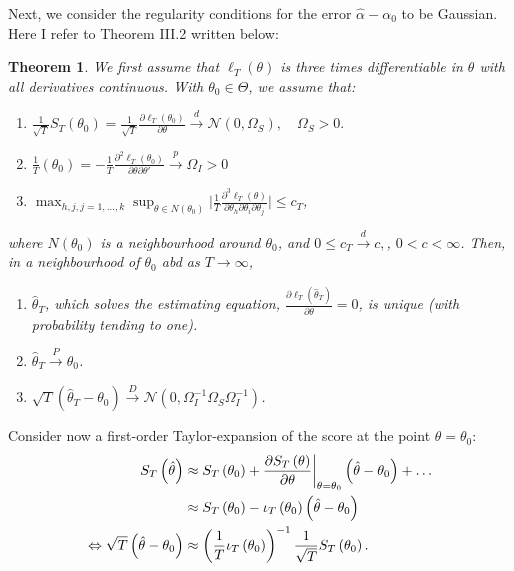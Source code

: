 \documentclass[11pt,a4paper,oneside]{article}
\newcommand{\LL}{\Leftrightarrow}
\newcommand{\lp}{\left(}
\newcommand{\rp}{\right)}
\newcommand{\nnn}{\mathcal{N}}
\newtheorem{theorem}{Theorem}
\begin{document}
Next, we consider the regularity conditions for the error $\hat \alpha - \alpha_0$ to be Gaussian. Here I refer to Theorem III.2 written below:
\begin{theorem}
We first assume that $\ell_T\lp \theta\rp$ is three times differentiable in $\theta$ with all derivatives continuous. With $\theta_0 \in \Theta$, we assume that:
\begin{enumerate}
    \item $\frac{1}{\sqrt{T}}S_T\lp \theta_0\rp = \frac{1}{\sqrt{T}}\frac{\partial \ell_T\lp \theta_0\rp}{\partial\theta} \overset{d}{\rightarrow} \nnn\lp 0, \Omega_S\rp, \quad \Omega_S > 0.$
    \item $\frac{1}{T}\lp \theta_0\rp = - \frac{1}{T}\frac{\partial^2 \ell_T\lp \theta_0\rp}{\partial\theta\partial\theta'}\overset{p}{\rightarrow}\Omega_I>0$
    \item $\max_{h,j,j=1, \dots, k}\sup_{\theta\in N\lp\theta_0\rp}\bigg\vert \frac{1}{T}\frac{\partial^3 \ell_T\lp \theta\rp}{\partial \theta_h\partial \theta_i \partial \theta_j}\bigg\vert \leq c_T$,
\end{enumerate}
where $N\lp \theta_0\rp$ is a neighbourhood around $\theta_0$, and $0\leq c_T \overset{d}{\rightarrow} c,$, $0 < c < \infty$.  Then, in a neighbourhood of $\theta_0$ abd as $T\rightarrow \infty$,
\begin{enumerate}
    \item $\hat \theta_T$, which solves the estimating equation, $\frac{\partial \ell_T\lp \hat \theta_T\rp}{\partial \theta} = 0$, is unique (with probability tending to one).
    \item $\hat \theta_T \overset{P}{\rightarrow} \theta_0$.
    \item $\sqrt{T}\lp \hat \theta_T - \theta_0\rp \overset{D}{\rightarrow} \nnn\lp 0, \Omega_I^{-1}\Omega_S\Omega_I^{-1}\rp$.
\end{enumerate}
\end{theorem}

Consider now a first-order Taylor-expansion of the score at the point $\theta = \theta_0$:
\begin{align}
    S_T\lp \hat \theta\rp 
        &\approx S_T\lp \theta_0 \rp + \frac{\partial S_T\lp \theta\rp}{\partial \theta}\bigg\vert_{\theta = \theta_0} \lp \hat \theta - \theta_0\rp + \dots  \notag \\
        &\approx S_T \lp \theta_0\rp - \iota_T\lp \theta_0\rp \lp \hat \theta - \theta_0\rp \notag \\
    \LL \sqrt{T}\lp \hat \theta - \theta_0\rp
        &\approx \lp \frac{1}{T}\iota_T\lp \theta_0\rp \rp^{-1} \frac{1}{\sqrt{T}}S_T\lp \theta_0\rp.
\end{align}
\end{document}
